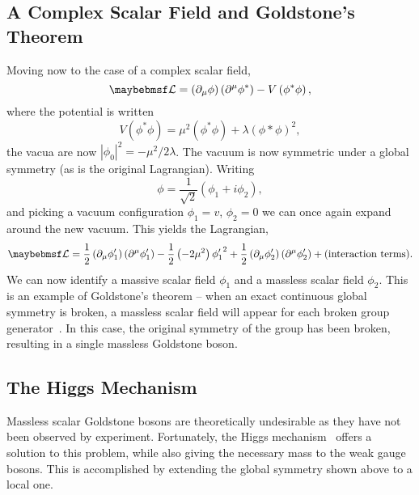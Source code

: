 \subsection{A Complex Scalar Field and Goldstone's Theorem}
\label{sec:sm_goldstone}
Moving now to the case of a complex scalar field,
\begin{equation*}
\lagrangiand = \left(\partial_{\mu}\phi\right)\left(\partial^{\mu}\phi^*\right)
- V\left(\phi^*\phi\right),
\end{equation*}
where the potential is written
\begin{equation*}
V\left(\phi^*\phi\right) = \mu^2\left(\phi^*\phi\right) +
\lambda\left(\phi*\phi\right)^2,
\end{equation*}
the vacua are now $\left|\phi_0\right|^2 = -\mu^2/2\lambda$. The vacuum is now
symmetric under a global \Uone symmetry (as is the original Lagrangian). Writing
\begin{equation*}
\phi = \frac{1}{\sqrt{2}}\left(\phi_1 + i\phi_2\right),
\end{equation*}
and picking a vacuum configuration $\phi_1 = v$, $\phi_2 = 0$ we can once again
expand around the new vacuum. This yields the Lagrangian,
\begin{equation*}
  \lagrangiand =
  \frac{1}{2}\left(\partial_{\mu}\phi'_1\right)\left(\partial^{\mu}\phi'_1\right)
  -\frac{1}{2}\left(-2\mu^2\right){\phi'_1}^2 +
  \frac{1}{2}\left(\partial_{\mu}\phi'_2\right)\left(\partial^{\mu}\phi'_2\right)
  + \textrm{(interaction terms)}.
\end{equation*}
We can now identify a massive scalar field $\phi_1$ and a massless scalar field
$\phi_2$. This is an example of Goldstone's theorem -- when an exact continuous
global symmetry is broken, a massless scalar field will appear for each broken
group generator~\cite{nambu, goldstone}. In this case, the original \Uone
symmetry of the group has been broken, resulting in a single massless Goldstone
boson.

\subsection{The Higgs Mechanism}\label{sec:sm_higgs}
Massless scalar Goldstone bosons are theoretically undesirable as they have not
been observed by experiment. Fortunately, the Higgs
mechanism~\cite{higgs,kibble,englert} offers a solution to this problem, while
also giving the necessary mass to the weak gauge bosons. This is accomplished by
extending the global symmetry shown above to a local one.


